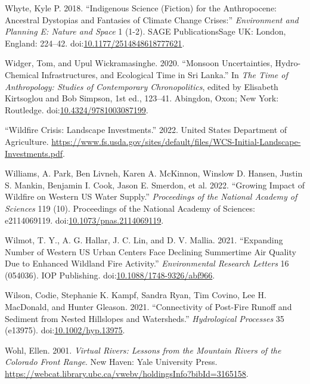 \documentclass[
]{article}
\newlength{\cslhangindent}
\newenvironment{CSLReferences}[2] %
 {\begin{list}{}{%
  \setlength{\itemindent}{0pt}
  \setlength{\leftmargin}{0pt}
  \setlength{\parsep}{0pt}
  \ifodd #1
   \setlength{\leftmargin}{\cslhangindent}
   \setlength{\itemindent}{-1\cslhangindent}
  \fi
  \setlength{\itemsep}{#2\baselineskip}}}
 {\end{list}}
\begin{document}
\begin{CSLReferences}{1}{0}
Whyte, Kyle P. 2018. {``Indigenous Science (Fiction) for the {Anthropocene}: {Ancestral} Dystopias and Fantasies of Climate Change Crises:''} \emph{Environment and Planning E: Nature and Space} 1 (1-2). SAGE PublicationsSage UK: London, England: 224--42. doi:\href{https://doi.org/10.1177/2514848618777621}{10.1177/2514848618777621}.

Widger, Tom, and Upul Wickramasinghe. 2020. {``Monsoon Uncertainties, Hydro-Chemical Infrastructures, and Ecological Time in {Sri Lanka}.''} In \emph{The {Time} of {Anthropology}: {Studies} of {Contemporary Chronopolitics}}, edited by Elisabeth Kirtsoglou and Bob Simpson, 1st ed., 123--41. Abingdon, Oxon; New York: Routledge. doi:\href{https://doi.org/10.4324/9781003087199}{10.4324/9781003087199}.

{``Wildfire {Crisis}: {Landscape Investments}.''} 2022. United States Department of Agriculture. \url{https://www.fs.usda.gov/sites/default/files/WCS-Initial-Landscape-Investments.pdf}.

Williams, A. Park, Ben Livneh, Karen A. McKinnon, Winslow D. Hansen, Justin S. Mankin, Benjamin I. Cook, Jason E. Smerdon, et al. 2022. {``Growing Impact of Wildfire on Western {US} Water Supply.''} \emph{Proceedings of the National Academy of Sciences} 119 (10). Proceedings of the National Academy of Sciences: e2114069119. doi:\href{https://doi.org/10.1073/pnas.2114069119}{10.1073/pnas.2114069119}.

Wilmot, T. Y., A. G. Hallar, J. C. Lin, and D. V. Mallia. 2021. {``Expanding Number of {Western US} Urban Centers Face Declining Summertime Air Quality Due to Enhanced Wildland Fire Activity.''} \emph{Environmental Research Letters} 16 (054036). IOP Publishing. doi:\href{https://doi.org/10.1088/1748-9326/abf966}{10.1088/1748-9326/abf966}.

Wilson, Codie, Stephanie K. Kampf, Sandra Ryan, Tim Covino, Lee H. MacDonald, and Hunter Gleason. 2021. {``Connectivity of Post-Fire Runoff and Sediment from Nested Hillslopes and Watersheds.''} \emph{Hydrological Processes} 35 (e13975). doi:\href{https://doi.org/10.1002/hyp.13975}{10.1002/hyp.13975}.

Wohl, Ellen. 2001. \emph{Virtual Rivers: Lessons from the Mountain Rivers of the {Colorado} Front Range}. New Haven: Yale University Press. \url{https://webcat.library.ubc.ca/vwebv/holdingsInfo?bibId=3165158}.


\end{CSLReferences}
\end{document}
